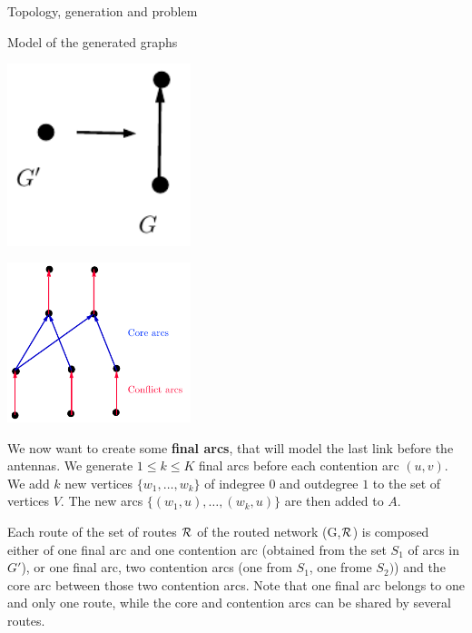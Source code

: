 \documentclass[10pt]{article}
\begin{document}
\begin{section}{Topology, generation and problem}
\begin{subsection}{Model of the generated graphs}
\begin{minipage}{.5\linewidth}
\begin{center}
\includegraphics[width=0.4\textwidth]{extendnode}
\label{fig:extendnode}
\end{center}

\end{minipage}
\begin{minipage}{.5\linewidth}

\begin{center}
\includegraphics[width=0.4\textwidth]{extendendgraph}
\label{fig:extendendgraph}
\end{center}

\end{minipage}

 We now want to create some \textbf{final arcs}, that will model the last link before the antennas.
We generate $1\leq k\leq K$ final arcs before each contention arc $(u,v)$. We add $k$ new vertices $\{w_1,\ldots,w_k\}$ of indegree $0$ and outdegree $1$ to the set of vertices $V$. The new arcs $\{(w_1,u),\ldots,(w_k,u)\}$ are then added to $A$. 

Each route of the set of routes $\cal{R}$ of the routed network (G,$\cal{R}$) is composed either of one final arc and one contention arc (obtained from the set $S_1$ of arcs in $G'$), or one final arc, two contention arcs (one from $S_1$, one frome $S_2)$) and the core arc between those two contention arcs.
Note that one final arc belongs to one and only one route, while the core and contention arcs can be shared by several routes.


\end{subsection}
\end{section}
\end{document}
